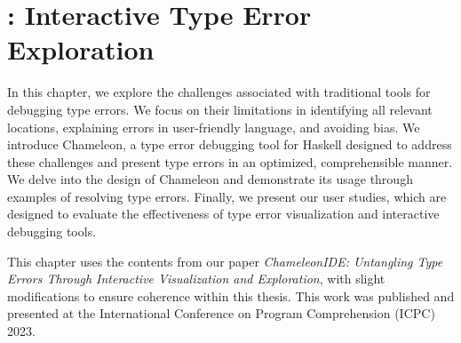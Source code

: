 \graphicspath{{Figures/Chameleon}}

\chapter{\chameleon{}: Interactive Type Error Exploration}


\label{chap:chameleon} 

In this chapter, we explore the challenges associated with traditional tools for debugging type errors. We focus on their limitations in identifying all relevant locations, explaining errors in user-friendly language, and avoiding bias. We introduce Chameleon, a type error debugging tool for Haskell designed to address these challenges and present type errors in an optimized, comprehensible manner. We delve into the design of Chameleon and demonstrate its usage through examples of resolving type errors. Finally, we present our user studies, which are designed to evaluate the effectiveness of type error visualization and interactive debugging tools.


 This chapter uses the contents from our paper \textit{ChameleonIDE: Untangling Type Errors Through Interactive Visualization and
Exploration}, with slight modifications to ensure coherence within this thesis. This work was published and presented at the International Conference on Program Comprehension (ICPC) 2023.







